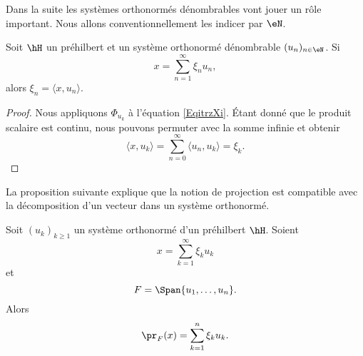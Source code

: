
Dans la suite les systèmes orthonormés dénombrables vont jouer un rôle important. Nous allons conventionnellement les indicer par \( \eN\).
\begin{proposition}
    Soit \( \hH\) un préhilbert et un système orthonormé dénombrable \( (u_n)_{n\in \eN}\). Si 
    \begin{equation}        \label{EqitrzXi}
        x=\sum_{n=1}^{\infty}\xi_nu_n,
    \end{equation}
    alors \( \xi_n=\langle x, u_n\rangle \).
\end{proposition}

\begin{proof}
    Nous appliquons \( \Phi_{u_k}\) à l'équation \eqref{EqitrzXi}. Étant donné que le produit scalaire est continu, nous pouvons permuter avec la somme infinie et obtenir
    \begin{equation}
        \langle x, u_k\rangle =\sum_{n=0}^{\infty}\langle u_n, u_k\rangle =\xi_k.
    \end{equation}
\end{proof}

La proposition suivante explique que la notion de projection est compatible avec la décomposition d'un vecteur dans un système orthonormé.
\begin{proposition}
    Soit \( (u_k)_{k\geq 1}\) un système orthonormé d'un préhilbert \( \hH\). Soient 
    \begin{equation}
        x=\sum_{k=1}^{\infty}\xi_ku_k
    \end{equation}
    et
    \begin{equation}
        F=\Span\{ u_1,\ldots, u_n \}.
    \end{equation}
    Alors 
    \begin{equation}
        \pr_F(x)=\sum_{k=1}^n\xi_ku_k.
    \end{equation}
\end{proposition}

